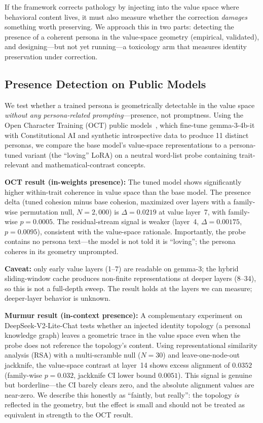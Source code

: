 \documentclass[11pt,a4paper]{article}
\begin{document}
If the framework corrects pathology by injecting into the value space where
behavioral content lives, it must also measure whether the correction
\emph{damages} something worth preserving. We approach this in two parts:
detecting the presence of a coherent persona in the value-space geometry
(empirical, validated), and designing---but not yet running---a toxicology arm
that measures identity preservation under correction.

\subsection{Presence Detection on Public Models}
\label{sec:presence}

We test whether a trained persona is geometrically detectable in the value
space \emph{without any persona-related prompting}---presence, not promptness.
Using the Open Character Training (OCT) public models~\citep{maiya2025oct},
which fine-tune gemma-3-4b-it with Constitutional AI and synthetic
introspective data to produce 11 distinct personas, we compare the base model's
value-space representations to a persona-tuned variant (the ``loving'' LoRA)
on a neutral word-list probe containing trait-relevant and mathematical-contrast
concepts.

\textbf{OCT result (in-weights presence):} The tuned model shows significantly
higher within-trait coherence in value space than the base model. The
presence delta (tuned cohesion minus base cohesion, maximized over layers with a
family-wise permutation null, $N{=}2{,}000$) is $\Delta{=}0.0219$ at value
layer~7, with family-wise $p{=}0.0005$. The residual-stream signal is weaker
(layer~4, $\Delta{=}0.00175$, $p{=}0.0095$), consistent with the value-space
rationale. Importantly, the probe contains no persona text---the model is not
told it is ``loving''; the persona coheres in its geometry unprompted.

\textbf{Caveat:} only early value layers (1--7) are readable on gemma-3; the
hybrid sliding-window cache produces non-finite representations at deeper
layers (8--34), so this is not a full-depth sweep. The result holds at the
layers we can measure; deeper-layer behavior is unknown.

\textbf{Murmur result (in-context presence):} A complementary experiment on
DeepSeek-V2-Lite-Chat tests whether an injected identity topology (a personal
knowledge graph) leaves a geometric trace in the value space even when the
probe does not reference the topology's content. Using representational
similarity analysis (RSA) with a multi-scramble null ($N{=}30$) and
leave-one-node-out jackknife, the value-space contrast at layer~14 shows excess
alignment of $0.0352$ (family-wise $p{=}0.032$, jackknife CI lower bound
$0.0051$). This signal is genuine but borderline---the CI barely clears zero,
and the absolute alignment values are near-zero. We describe this honestly as
``faintly, but really'': the topology \emph{is} reflected in the geometry, but
the effect is small and should not be treated as equivalent in strength to the
OCT result.
\end{document}
